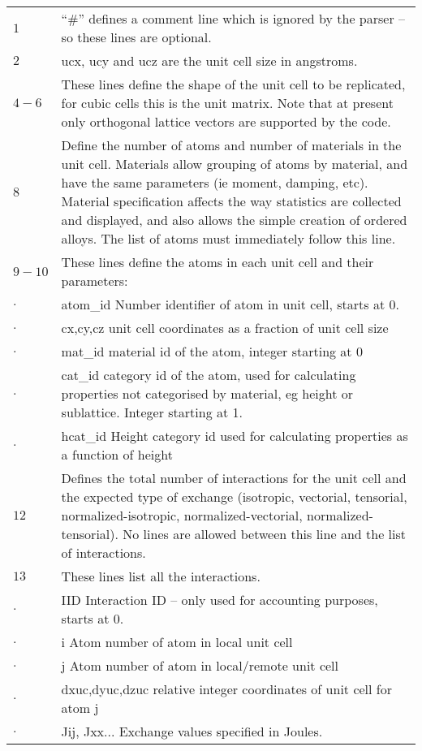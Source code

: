 \begin{tabular}{ l p{8cm} }
$1$    & “\#” defines a comment line which is ignored by the parser – so these lines are optional.\\
$2$    & ucx, ucy and ucz are the unit cell size in angstroms.\\
$4-6$  & These lines define the shape of the unit cell to be replicated, for cubic cells this is the unit matrix. Note that at present only orthogonal lattice vectors are supported by the code.\\
$8$    & Define the number of atoms and number of materials in the unit cell. Materials allow grouping of atoms by material, and have the same parameters (ie moment, damping, etc). Material specification affects the way statistics are collected and displayed, and also allows the simple creation of ordered alloys. The list of atoms must immediately follow this line.\\
$9-10$ & These lines define the atoms in each unit cell and their parameters:\\
$.$	 & atom\_id    Number identifier of atom in unit cell, starts at 0.\\
$.$	 & cx,cy,cz   unit cell coordinates as a fraction of unit cell size\\
$.$	 & mat\_id  material id of the atom, integer starting at 0\\
$.$	 & cat\_id  category id of the atom, used for calculating properties not categorised by material, eg height or sublattice. Integer starting at 1.\\
$.$	 & hcat\_id Height category id used for calculating properties as a function of height\\
$12$   & Defines the total number of interactions for the unit cell and the expected type of exchange
(isotropic, vectorial, tensorial, normalized-isotropic, normalized-vectorial, normalized-tensorial). No lines are allowed between this line and the list of interactions.\\
$13$   & These lines list all the interactions.\\
$.$	   & IID Interaction ID – only used for accounting purposes, starts at 0.\\
$.$	   & i Atom number of atom in local unit cell\\
$.$    & j Atom number of atom in local/remote unit cell\\
$.$    & dxuc,dyuc,dzuc relative integer coordinates of unit cell for atom j\\
$.$    & Jij, Jxx... Exchange values specified in Joules. \\
\end{tabular}

